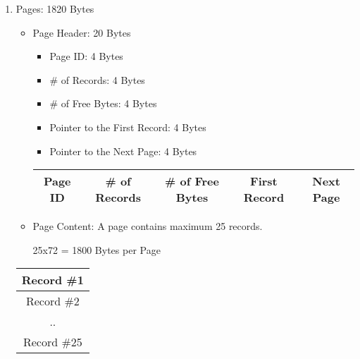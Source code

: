 \documentclass[12pt]{article}
\begin{document}
\begin{enumerate}
        
        
    \item Pages: 1820 Bytes
        \begin{itemize}
            \item Page Header: 20 Bytes
                \begin{itemize}
                    \item Page ID: 4 Bytes
                    \item \# of Records: 4 Bytes
                    \item \# of Free Bytes: 4 Bytes
                    \item Pointer to the First Record: 4 Bytes
                    \item Pointer to the Next Page: 4 Bytes
                \end{itemize}
                \begin{center}
                    \begin{tabular}{|c|c|c|c|c|}
                        \hline
                        Page ID & \# of Records & \# of Free Bytes & First Record & Next Page \\
                        \hline
                    \end{tabular}
                    \end{center}
                
            \item Page Content: A page contains maximum 25 records.
            \begin{center}
            25x72 = 1800 Bytes per Page
            \end{center}
        \end{itemize}
        
        \begin{center}
                \begin{tabular}{|c|}
                    \hline
                    Record \#1 \\
                    \hline
                    Record \#2 \\
                    \hline
                    .. \\
                    \hline
                    Record \#25 \\
                    \hline
               
                \end{tabular}
                \end{center}
                

\end{enumerate}
\end{document}
